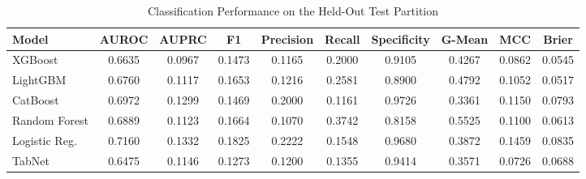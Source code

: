 \begin{table}
\centering
\caption{Classification Performance on the Held-Out Test Partition}
\label{tab:results}
\begin{tabular}{lccccccccc}
\toprule
Model & AUROC & AUPRC & F1 & Precision & Recall & Specificity & G-Mean & MCC & Brier \\
\midrule
XGBoost & 0.6635 & 0.0967 & 0.1473 & 0.1165 & 0.2000 & 0.9105 & 0.4267 & 0.0862 & 0.0545 \\
LightGBM & 0.6760 & 0.1117 & 0.1653 & 0.1216 & 0.2581 & 0.8900 & 0.4792 & 0.1052 & 0.0517 \\
CatBoost & 0.6972 & 0.1299 & 0.1469 & 0.2000 & 0.1161 & 0.9726 & 0.3361 & 0.1150 & 0.0793 \\
Random Forest & 0.6889 & 0.1123 & 0.1664 & 0.1070 & 0.3742 & 0.8158 & 0.5525 & 0.1100 & 0.0613 \\
Logistic Reg. & 0.7160 & 0.1332 & 0.1825 & 0.2222 & 0.1548 & 0.9680 & 0.3872 & 0.1459 & 0.0835 \\
TabNet & 0.6475 & 0.1146 & 0.1273 & 0.1200 & 0.1355 & 0.9414 & 0.3571 & 0.0726 & 0.0688 \\
\bottomrule
\end{tabular}
\end{table}

